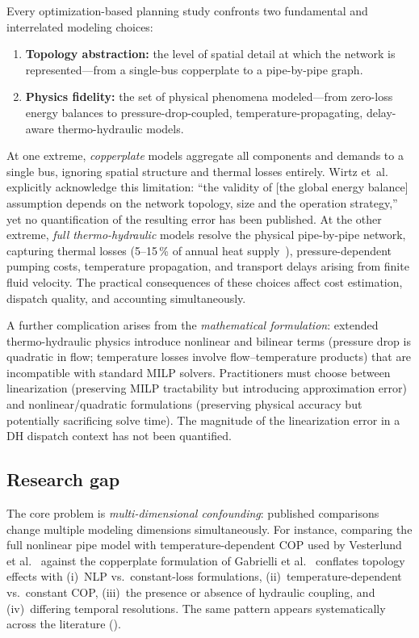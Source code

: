 \documentclass[review,3p]{elsarticle}
\begin{document}
Every optimization-based planning study confronts two fundamental and
interrelated modeling choices:
%
\begin{enumerate}[nosep]
  \item \textbf{Topology abstraction:} the level of spatial detail at
        which the network is represented---from a single-bus
        copperplate to a pipe-by-pipe graph.
  \item \textbf{Physics fidelity:} the set of physical phenomena
        modeled---from zero-loss energy balances to
        pressure-drop-coupled, temperature-propagating, delay-aware
        thermo-hydraulic models.
\end{enumerate}

At one extreme, \emph{copperplate} models aggregate all components
and demands to a single bus, ignoring spatial structure and thermal
losses entirely. Wirtz et~al.~\cite{Wirtz2020} explicitly acknowledge
this limitation: ``the validity of [the global energy balance]
assumption depends on the network topology, size and the operation
strategy,'' yet no quantification of the resulting error has been
published. At the other extreme, \emph{full thermo-hydraulic} models
resolve the physical pipe-by-pipe network, capturing thermal losses
(5--15\,\% of annual heat
supply~\cite{Frederiksen2013,Talebi2016}), pressure-dependent
pumping costs, temperature propagation, and transport delays arising
from finite fluid velocity. The practical consequences of these
choices affect cost estimation, dispatch quality, and 
accounting simultaneously.

A further complication arises from the \emph{mathematical
formulation}: extended thermo-hydraulic physics introduce nonlinear
and bilinear terms (pressure drop is quadratic in flow;
temperature losses involve flow--temperature products) that are
incompatible with standard MILP solvers. Practitioners must choose
between linearization (preserving MILP tractability but introducing
approximation error) and nonlinear/quadratic formulations
(preserving physical accuracy but potentially sacrificing solve
time). The magnitude of the linearization error in a DH dispatch
context has not been quantified.

\subsection{Research gap}
\label{sec:gap}

The core problem is \emph{multi-dimensional confounding}: published
comparisons change multiple modeling dimensions simultaneously. For
instance, comparing the full nonlinear pipe model with
temperature-dependent COP used by Vesterlund et
al.~\cite{Vesterlund2017} against the copperplate formulation of
Gabrielli et al.~\cite{Gabrielli2018} conflates topology effects
with (i)~NLP vs.\ constant-loss formulations,
(ii)~temperature-dependent vs.\ constant COP,
(iii)~the presence or absence of hydraulic coupling, and
(iv)~differing temporal resolutions. The same pattern appears
systematically across the literature ().
\end{document}
